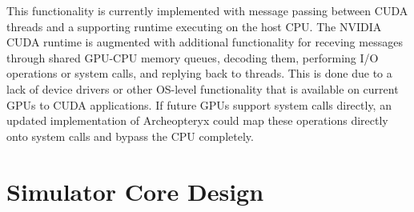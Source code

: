 \documentclass[conference, 10pt]{IEEEtran}
\begin{document}
This functionality is currently implemented with message passing between
CUDA threads and a supporting runtime executing on the host CPU.  The NVIDIA
CUDA runtime is augmented with additional functionality for receving messages
through shared GPU-CPU memory queues, decoding them, performing I/O operations
or system calls, and replying back to threads.  This is done due to a lack of
device drivers or other OS-level functionality that is available on current GPUs
to CUDA applications. If future GPUs support system calls directly, an updated
implementation of Archeopteryx could map these operations directly onto system
calls and bypass the CPU completely.



\section{Simulator Core Design}
\label{sec:core-design}
\end{document}
